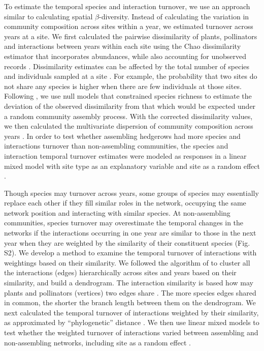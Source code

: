 \documentclass[12pt]{article}
\begin{document}
To estimate the temporal species and interaction turnover, we use an
approach similar to calculating spatial $\beta$-diversity. Instead of
calculating the variation in community composition across sites within
a year, we estimated turnover across years at a site. We first
calculated the pairwise dissimilarity of plants, pollinators and
interactions between years within each site using the Chao
dissimilarity estimator that incorporates abundances, while also
accounting for unobserved records \citep{chao-2005-148}. Dissimilarity
estimates can be affected by the total number of species and
individuals sampled at a site \citep[e.g.,][]{ponisio2015farm}. For
example, the probability that two sites do not share any species is
higher when there are few individuals at those sites. Following
\cite{ponisio2015farm}, we use null models that constrained species
richness to estimate the deviation of the observed dissimilarity from
that which would be expected under a random community assembly
process. With the corrected dissimilarity values, we then calculated
the multivariate dispersion of community composition across years
\citep{anderson-2011-19}. In order to test whether assembling
hedgerows had more species and interactions turnover than
non-assembling communities, the species and interaction temporal
turnover estimates were modeled as responses in a linear mixed model
with site type as an explanatory variable and site as a random effect
\citep{lme4, lmetest}.

Though species may turnover across years, some groups of species may
essentially replace each other if they fill similar roles in the
network, occupying the same network position and interacting with
similar species. At non-assembling communities, species turnover may
overestimate the temporal changes in the networks if the interactions
occurring in one year are similar to those in the next year when they
are weighted by the similarity of their constituent species (Fig.~
S2). We develop a method to examine the temporal turnover of
interactions with weightings based on their similarity. We followed
the algorithm of \cite{ahn2010link} to cluster all the interactions
(edges) hierarchically across sites and years based on their
similarity, and build a dendrogram. The interaction similarity is
based how may plants and pollinators (vertices) two edges share
\citep{ahn2010link, kalinka2011linkcomm}. The more species edges
shared in common, the shorter the branch length between them on the
dendrogram.  We next calculated the temporal turnover of interactions
weighted by their similarity, as approximated by ``phylogenetic''
distance \citep{graham2008phylogenetic, picante-2010-1463}. We then
use linear mixed models to test whether the weighted turnover of
interactions varied between assembling and non-assembling networks,
including site as a random effect \citep{lme4, lmetest}.
\end{document}

